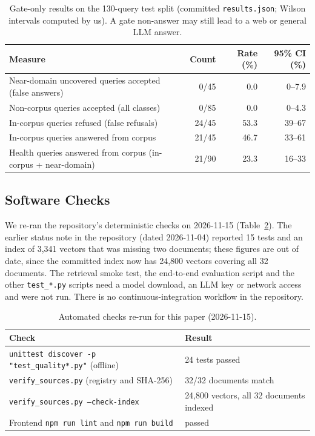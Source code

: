 \documentclass[10pt,a4paper]{article}
\newcommand{\code}[1]{\texttt{\small #1}}
\begin{document}
\begin{table}[t]
\centering\small
\caption{Gate-only results on the 130-query test split (committed \code{results.json}; Wilson intervals computed by us). A gate non-answer may still lead to a web or general LLM answer.}
\label{tab:gate}
\begin{tabular}{lrrr}
\toprule
Measure & Count & Rate (\%) & 95\% CI (\%)\\
\midrule
Near-domain uncovered queries accepted (false answers) & 0/45 & 0.0 & 0--7.9\\
Non-corpus queries accepted (all classes) & 0/85 & 0.0 & 0--4.3\\
In-corpus queries refused (false refusals) & 24/45 & 53.3 & 39--67\\
In-corpus queries answered from corpus & 21/45 & 46.7 & 33--61\\
Health queries answered from corpus (in-corpus + near-domain) & 21/90 & 23.3 & 16--33\\
\bottomrule
\end{tabular}
\end{table}

\subsection{Software Checks}\label{sec:software}
We re-ran the repository's deterministic checks on 2026-11-15 (Table~\ref{tab:checks}). The earlier status note in the repository (dated 2026-11-04) reported 15 tests and an index of 3,341 vectors that was missing two documents; these figures are out of date, since the committed index now has 24,800 vectors covering all 32 documents. The retrieval smoke test, the end-to-end evaluation script and the other \code{test\_*.py} scripts need a model download, an LLM key or network access and were not run. There is no continuous-integration workflow in the repository.

\begin{table}[t]
\centering\small
\caption{Automated checks re-run for this paper (2026-11-15).}
\label{tab:checks}
\begin{tabular}{p{9.5cm}l}
\toprule
Check & Result\\
\midrule
\code{unittest discover -p "test\_quality*.py"} (offline) & 24 tests passed\\
\code{verify\_sources.py} (registry and SHA-256) & 32/32 documents match\\
\code{verify\_sources.py --check-index} & 24,800 vectors, all 32 documents indexed\\
Frontend \code{npm run lint} and \code{npm run build} & passed\\
\bottomrule
\end{tabular}
\end{table}
\end{document}
